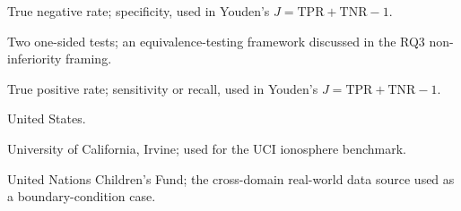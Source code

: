 \begin{description}[style=nextline,leftmargin=0pt,labelsep=0pt]
    \item[TNR] True negative rate; specificity, used in Youden's $J=\mathrm{TPR}+\mathrm{TNR}-1$.

    \item[TOST] Two one-sided tests; an equivalence-testing framework discussed in the RQ3 non-inferiority framing.

    \item[TPR] True positive rate; sensitivity or recall, used in Youden's $J=\mathrm{TPR}+\mathrm{TNR}-1$.

    \item[U.S.] United States.

    \item[UCI] University of California, Irvine; used for the UCI ionosphere benchmark.

    \item[UNICEF] United Nations Children's Fund; the cross-domain real-world data source used as a boundary-condition case.
\end{description}
